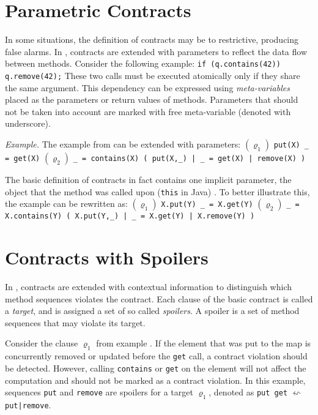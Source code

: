

\section{Parametric Contracts}

In some situations, the definition of contracts may be to restrictive, producing
false alarms. In \cite{FITPUB11510}, contracts are extended with parameters to
reflect the data flow between methods. Consider the following example:
\newline
\texttt{if (q.contains(42)) q.remove(42);} \newline
These two calls must be executed atomically only if they share the same
argument. This dependency can be expressed using \emph{meta-variables} placed as
the parameters or return values of methods. Parameters that should not be taken
into account are marked with free meta-variable (denoted with underscore).

\emph{Example.} The example from  can be extended with parameters:
 \newline
    $(\varrho_1)$ \texttt{put(X) \_ = get(X)} \newline
    $(\varrho_2)$ \texttt{\_ = contains(X) ( put(X,\_) | \_ = get(X) | remove(X) )}
    \newline

The basic definition of contracts in fact contains one implicit parameter, the
object that the method was called upon (\texttt{this} in Java)
\cite{FITPUB10817}. To better illustrate this, the example can be rewritten as:
 \newline
    $(\varrho_1)$ \texttt{X.put(Y) \_ = X.get(Y)} \newline
    $(\varrho_2)$ \texttt{\_ = X.contains(Y) ( X.put(Y,\_) | \_ = X.get(Y) | X.remove(Y) )}


\section{Contracts with Spoilers}

In \cite{FITPUB11510}, contracts are extended with contextual information to
distinguish which method sequences violates the contract. Each clause of the
basic contract is called a \emph{target}, and is assigned a set of so called
\emph{spoilers}. A spoiler is a set of method sequences that may violate its
target.

Consider the clause $\varrho_1$ from example . If the element that was put to the map is concurrently removed or
updated before the \texttt{get} call, a contract violation should be detected.
However, calling \texttt{contains} or \texttt{get} on the element will not
affect the computation and should not be marked as a contract violation. In this
example, sequences \texttt{put} and \texttt{remove} are spoilers for a target
$\varrho_1$, denoted as \texttt{put get} $\leftsquigarrow$
\texttt{put|remove}.

